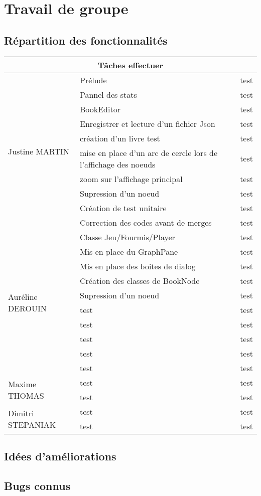 \chapter{Travail de groupe}


	\section{Répartition des fonctionnalités}
	\begin{tabular}{|l|l l|}
		\hline
		\multicolumn{3}{|c|}{Tâches effectuer} \\
		\hline
		\multirow{10}{*}{Justine MARTIN}
			& Prélude & test \\
			& Pannel des stats & test \\
			& BookEditor & test \\
			& Enregistrer et lecture d'un fichier Json & test \\
			& création d'un livre test & test \\
			& mise en place d'un arc de cercle lors de l'affichage des noeuds & test \\
			& zoom sur l'affichage principal & test \\
			& Supression d'un noeud & test \\
			& Création de test unitaire & test \\
			& Correction des codes avant de merges & test \\\hline
		\multirow{10}{*}{Auréline DEROUIN}
			& Classe Jeu/Fourmis/Player & test \\
			& Mis en place du GraphPane & test \\
			& Mis en place des boites de dialog & test \\
			& Création des classes de BookNode & test \\
			& Supression d'un noeud & test \\
			& test & test \\
			& test & test \\
			& test & test \\
			& test & test \\
			& test & test \\ \hline
  		\multirow{2}{*}{Maxime THOMAS}
			& test & test \\
			& test & test \\ \hline
		\multirow{2}{*}{Dimitri STEPANIAK}
			& test & test \\
			& test & test \\\hline
		\end{tabular}

	\section{Idées d'améliorations}



	\section{Bugs connus}
